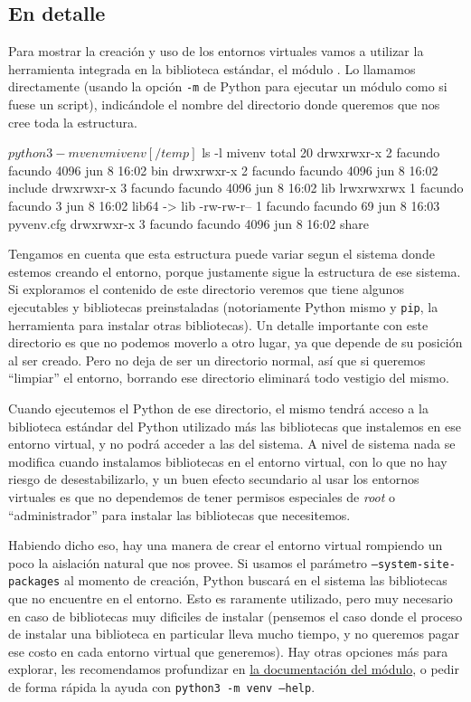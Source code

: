 \subsection{En detalle}

Para mostrar la creación y uso de los entornos virtuales vamos a utilizar la herramienta integrada en la biblioteca estándar, el módulo . Lo llamamos directamente (usando la opción \verb|-m| de Python para ejecutar un módulo como si fuese un script), indicándole el nombre del directorio donde queremos que nos cree toda la estructura.

\begin{shell}
    [/temp]$ python3 -m venv mivenv
    [/temp]$ ls -l mivenv
    total 20
    drwxrwxr-x 2 facundo facundo 4096 jun  8 16:02 bin
    drwxrwxr-x 2 facundo facundo 4096 jun  8 16:02 include
    drwxrwxr-x 3 facundo facundo 4096 jun  8 16:02 lib
    lrwxrwxrwx 1 facundo facundo    3 jun  8 16:02 lib64 -> lib
    -rw-rw-r-- 1 facundo facundo   69 jun  8 16:03 pyvenv.cfg
    drwxrwxr-x 3 facundo facundo 4096 jun  8 16:02 share
\end{shell}

Tengamos en cuenta que esta estructura puede variar segun el sistema donde estemos creando el entorno, porque justamente sigue la estructura de ese sistema. Si exploramos el contenido de este directorio veremos que tiene algunos ejecutables y bibliotecas preinstaladas (notoriamente Python mismo y \texttt{pip}, la herramienta para instalar otras bibliotecas). Un detalle importante con este directorio es que no podemos moverlo a otro lugar, ya que depende de su posición al ser creado. Pero no deja de ser un directorio normal, así que si queremos ``limpiar'' el entorno, borrando ese directorio eliminará todo vestigio del mismo.

Cuando ejecutemos el Python de ese directorio, el mismo tendrá acceso a la biblioteca estándar del Python utilizado más las bibliotecas que instalemos en ese entorno virtual, y no podrá acceder a las del sistema. A nivel de sistema nada se modifica cuando instalamos bibliotecas en el entorno virtual, con lo que no hay riesgo de desestabilizarlo, y un buen efecto secundario al usar los entornos virtuales es que no dependemos de tener permisos especiales de \textit{root} o ``administrador'' para instalar las bibliotecas que necesitemos.

Habiendo dicho eso, hay una manera de crear el entorno virtual rompiendo un poco la aislación natural que nos provee. Si usamos el parámetro \texttt{--system-site-packages} al momento de creación, Python buscará en el sistema las bibliotecas que no encuentre en el entorno. Esto es raramente utilizado, pero muy necesario en caso de bibliotecas muy dificiles de instalar (pensemos el caso donde el proceso de instalar una biblioteca en particular lleva mucho tiempo, y no queremos pagar ese costo en cada entorno virtual que generemos). Hay otras opciones más para explorar, les recomendamos profundizar en \href{https://docs.python.org/es/dev/library/venv.html}{la documentación del módulo}, o pedir de forma rápida la ayuda con \texttt{python3 -m venv --help}.

